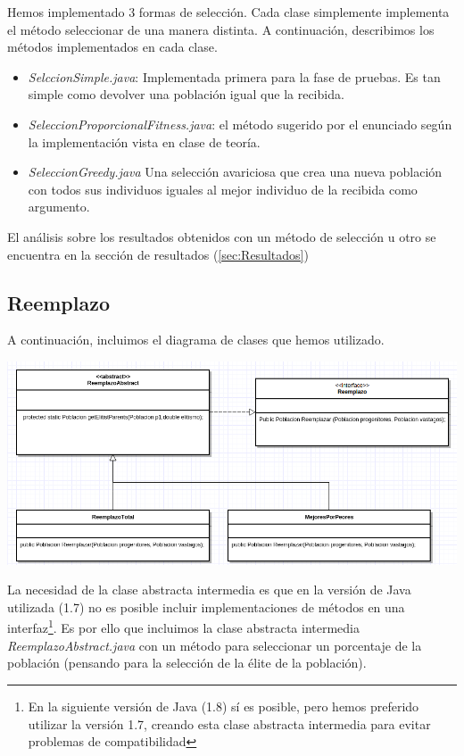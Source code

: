 \documentclass[nochap]{apuntes}
\begin{document}
Hemos implementado 3 formas de selección. Cada clase simplemente implementa el método seleccionar de una manera distinta. A continuación, describimos los métodos implementados en cada clase.
\label{est:SeleccionSimple}
\begin{itemize}
 	\item \textit{SelccionSimple.java}: Implementada primera para la fase de pruebas. Es tan simple como devolver una población igual que la recibida.
 	\item \textit{SeleccionProporcionalFitness.java}: el método sugerido por el enunciado según la implementación vista en clase de teoría.
 	\item \textit{SeleccionGreedy.java} Una selección avariciosa que crea una nueva población con todos sus individuos iguales al mejor individuo de la recibida como argumento.
 \end{itemize}  


 El análisis sobre los resultados obtenidos con un método de selección u otro se encuentra en la sección de resultados (\ref{sec:Resultados}) 


\subsection{Reemplazo}
A continuación, incluimos el diagrama de clases que hemos utilizado.


\begin{center}
\includegraphics[scale=0.4]{img/ReemplazoUML.png}
\end{center}

La necesidad de la clase abstracta intermedia es que en la versión de Java utilizada (1.7) no es posible incluir implementaciones de métodos en una interfaz\footnote{En la siguiente versión de Java (1.8) sí es posible, pero hemos preferido utilizar la versión 1.7, creando esta clase abstracta intermedia para evitar problemas de compatibilidad}. Es por ello que incluimos la clase abstracta intermedia \textit{ReemplazoAbstract.java} con un método para seleccionar un porcentaje de la población (pensando para la selección de la élite de la población).
\end{document}
